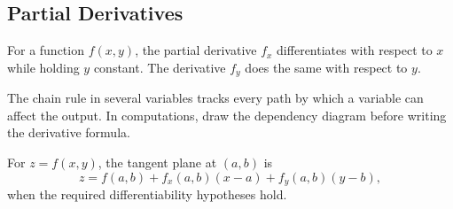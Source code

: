 \subsection*{Partial Derivatives}

\begin{definition*}
For a function \(f(x,y)\), the partial derivative \(f_x\) differentiates with
respect to \(x\) while holding \(y\) constant. The derivative \(f_y\) does the
same with respect to \(y\).
\end{definition*}

\begin{remark*}
The chain rule in several variables tracks every path by which a variable can
affect the output. In computations, draw the dependency diagram before
writing the derivative formula.
\end{remark*}

\begin{definition*}
For \(z=f(x,y)\), the tangent plane at \((a,b)\) is
\[
  z=f(a,b)+f_x(a,b)(x-a)+f_y(a,b)(y-b),
\]
when the required differentiability hypotheses hold.
\end{definition*}
